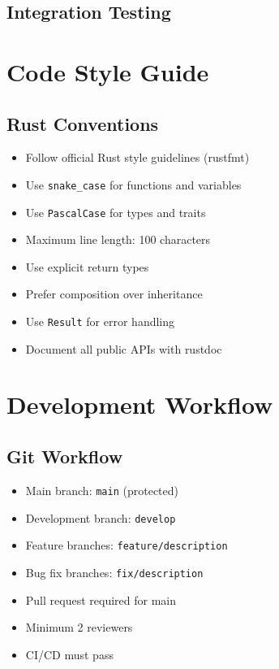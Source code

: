 \documentclass[12pt,a4paper,twoside]{report}
\begin{document}

\section{Integration Testing}



\appendix

\chapter{Code Style Guide}

\section{Rust Conventions}

\begin{itemize}[leftmargin=*]
    \item Follow official Rust style guidelines (rustfmt)
    \item Use \texttt{snake\_case} for functions and variables
    \item Use \texttt{PascalCase} for types and traits
    \item Maximum line length: 100 characters
    \item Use explicit return types
    \item Prefer composition over inheritance
    \item Use \texttt{Result} for error handling
    \item Document all public APIs with rustdoc
\end{itemize}

\chapter{Development Workflow}

\section{Git Workflow}

\begin{itemize}[leftmargin=*]
    \item Main branch: \texttt{main} (protected)
    \item Development branch: \texttt{develop}
    \item Feature branches: \texttt{feature/description}
    \item Bug fix branches: \texttt{fix/description}
    \item Pull request required for main
    \item Minimum 2 reviewers
    \item CI/CD must pass
\end{itemize}
\end{document}
